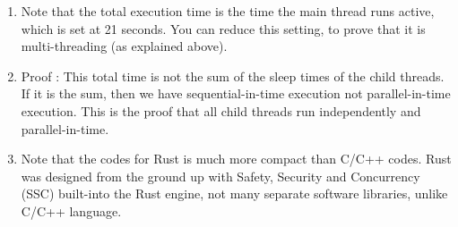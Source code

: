 \begin{enumerate}
	\item Note that the total execution time is the time the main thread runs active, which is set at 21 seconds. You can reduce this setting, to prove that it is multi-threading (as explained above).
	
	\item Proof : This total time is not the sum of the sleep times of the child threads. If it is the sum, then we have sequential-in-time execution not parallel-in-time execution. This is the proof that all child threads run independently and parallel-in-time.
	
	\item Note that the codes for Rust is much more compact than C/C++ codes. Rust was designed from the ground up with Safety, Security and Concurrency (SSC) built-into the Rust engine, not many separate software libraries, unlike C/C++ language. 
	
\end{enumerate}

\pagebreak


